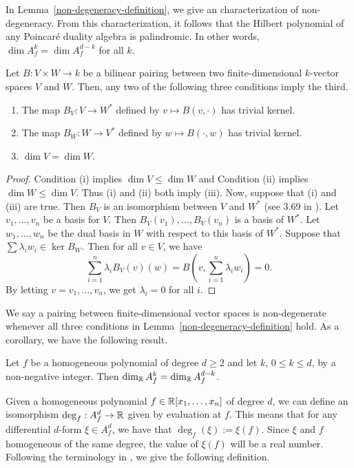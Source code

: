 \documentclass{puthesis-UG}
\begin{document}
In Lemma~\ref{non-degeneracy-definition}, we give an characterization of non-degeneracy. From this characterization, it follows that the Hilbert polynomial of any Poincar\'e duality algebra is palindromic. In other words, $\dim A_f^k = \dim A_f^{d-k}$ for all $k$. 

\begin{lem} \label{non-degeneracy-definition}
	Let $B : V \times W \to k$ be a bilinear pairing between two finite-dimensional $k$-vector spaces $V$ and $W$. Then, any two of the following three conditions imply the third. 
		\begin{enumerate}[label = (\roman*)]
			\item The map $B_V : V \to W^*$ defined by $v \mapsto B(v, \cdot)$ has trivial kernel.
			\item The map $B_W : W \to V^*$ defined by $w \mapsto B(\cdot, w)$ has trivial kernel. 
			\item $\dim V = \dim W$. 
		\end{enumerate}
	\end{lem}

	\begin{proof}
		Condition (i) implies $\dim V \leq \dim W$ and Condition (ii) implies $\dim W \leq \dim V$. Thus (i) and (ii) both imply (iii). Now, suppose that (i) and (iii) are true. Then $B_V$ is an isomorphism between $V$ and $W^*$ (see 3.69 in \cite{axler}). Let $v_1, \ldots, v_n$ be a basis for $V$. Then $B_V(v_1), \ldots, B_V(v_n)$ is a basis of $W^*$. Let $w_1, \ldots, w_n$ be the dual basis in $W$ with respect to this basis of $W^*$. Suppose that $\sum \lambda_i w_i \in \ker B_W$. Then for all $v \in V$, we have 
		\[
			\sum_{i = 1}^n \lambda_i B_V(v)(w) = B \left ( v, \sum_{i = 1}^n \lambda_i w_i \right ) = 0. 
		\]
		By letting $v = v_1, \ldots, v_n$, we get $\lambda_i = 0$ for all $i$. 
	\end{proof}

We say a pairing between finite-dimensional vector spaces is non-degenerate whenever all three conditions in Lemma~\ref{non-degeneracy-definition} hold. As a corollary, we have the following result.

\begin{cor} \label{same-dimensions}
	Let $f$ be a homogeneous polynomial of degree $d \geq 2$ and let $k$, $0 \leq k \leq d$, by a non-negative integer. Then $\dim_{\mathbb{R}} A_f^k = \dim_{\mathbb{R}} A_f^{d-k}$. 
\end{cor}

Given a homogeneous polynomial $f \in \mathbb{R}[x_1, \ldots, x_n]$ of degree $d$, we can define an isomorphism $\deg_f : A_f^d \to \mathbb{R}$ given by evaluation at $f$. This means that for any differential $d$-form $\xi \in A_f^d$, we have that $\deg_f (\xi) := \xi(f)$. Since $\xi$ and $f$ homogeneous of the same degree, the value of $\xi(f)$ will be a real number. Following the terminology in \cite{AHK}, we give the following definition. 
\end{document}
